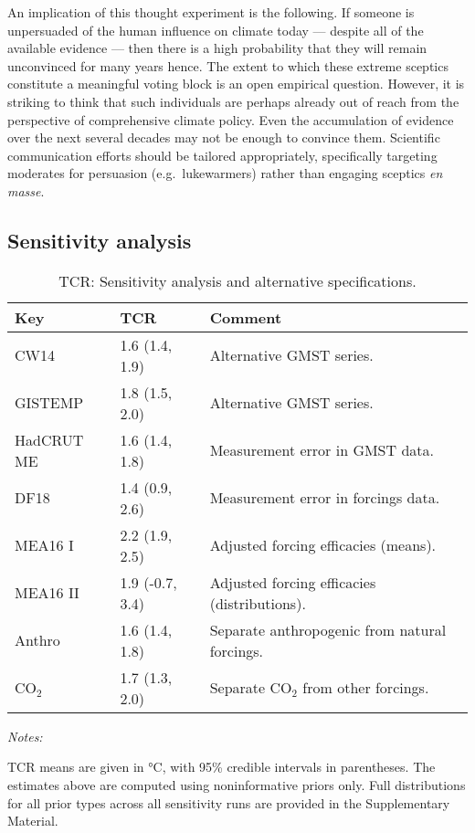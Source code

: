 \documentclass[smallextended]{svjour3}       %
\begin{document}
An implication of this thought experiment is the following. If someone
is unpersuaded of the human influence on climate today --- despite all
of the available evidence --- then there is a high probability that they
will remain unconvinced for many years hence. The extent to which these
extreme sceptics constitute a meaningful voting block is an open
empirical question. However, it is striking to think that such
individuals are perhaps already out of reach from the perspective of
comprehensive climate policy. Even the accumulation of evidence over the
next several decades may not be enough to convince them. Scientific
communication efforts should be tailored appropriately, specifically
targeting moderates for persuasion (e.g.~lukewarmers) rather than
engaging sceptics \emph{en masse}.

\hypertarget{sec:sensitivity}{%
\subsection{Sensitivity analysis}\label{sec:sensitivity}}

\begin{table}

\caption{\label{tab:sens_tab}TCR: Sensitivity analysis and alternative specifications. \label{tab:sensitivity}}
\centering
\begin{threeparttable}
\begin{tabular}[t]{lll}
\toprule
Key & TCR & Comment\\
\midrule
CW14 & 1.6 (1.4, 1.9) & Alternative GMST series.\\
GISTEMP & 1.8 (1.5, 2.0) & Alternative GMST series.\\
HadCRUT ME & 1.6 (1.4, 1.8) & Measurement error in GMST data.\\
DF18 & 1.4 (0.9, 2.6) & Measurement error in forcings data.\\
MEA16 I & 2.2 (1.9, 2.5) & Adjusted forcing efficacies (means).\\
\addlinespace
MEA16 II & 1.9 (-0.7, 3.4) & Adjusted forcing efficacies (distributions).\\
Anthro & 1.6 (1.4, 1.8) & Separate anthropogenic from natural forcings.\\
CO$_2$ & 1.7 (1.3, 2.0) & Separate CO$_2$ from other forcings.\\
\bottomrule
\end{tabular}
\begin{tablenotes}[para]
\item \textit{Notes:} 
\item TCR means are given in °C, with 95\% credible intervals in parentheses. The estimates above are computed using noninformative priors only. Full distributions for all prior types across all sensitivity runs are provided in the Supplementary Material.
\end{tablenotes}
\end{threeparttable}
\end{table}
\end{document}
